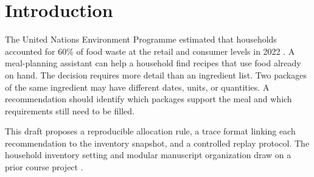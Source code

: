 \section{Introduction}
The United Nations Environment Programme estimated that households accounted for 60\% of food waste at the retail and consumer levels in 2022 \cite{unep}. A meal-planning assistant can help a household find recipes that use food already on hand. The decision requires more detail than an ingredient list. Two packages of the same ingredient may have different dates, units, or quantities. A recommendation should identify which packages support the meal and which requirements still need to be filled.

This draft proposes a reproducible allocation rule, a trace format linking each recommendation to the inventory snapshot, and a controlled replay protocol. The household inventory setting and modular manuscript organization draw on a prior course project \cite{course}.
